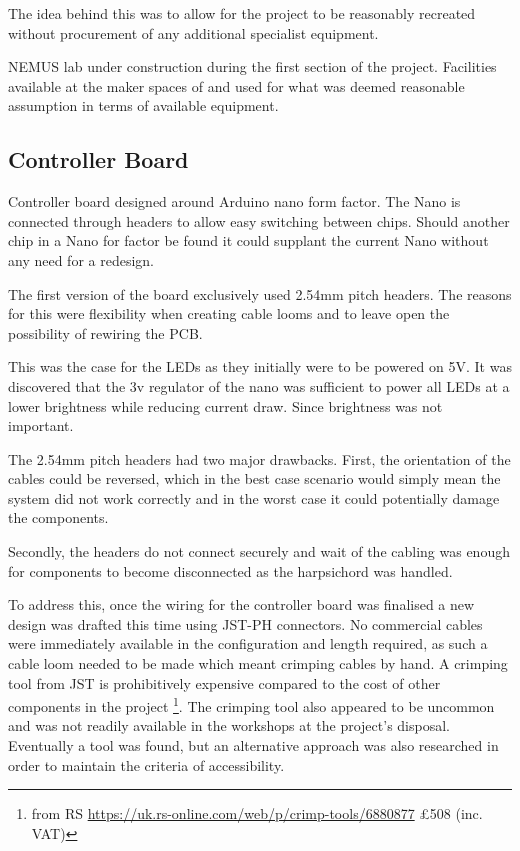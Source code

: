 The idea behind this was to allow for the project to be reasonably
recreated without procurement of any additional specialist equipment.

NEMUS lab under construction during the first section of the project.
Facilities available at the maker spaces of  and
 used for what was deemed reasonable assumption in
terms of available equipment.


\subsection{Controller Board}\label{controller-board}

Controller board designed around Arduino nano form factor. The Nano is
connected through headers to allow easy switching between chips. Should
another chip in a Nano for factor be found it could supplant the current
Nano without any need for a redesign.

The first version of the board exclusively used 2.54mm pitch headers.
The reasons for this were flexibility when creating cable looms and to
leave open the possibility of rewiring the PCB.

This was the case for the LEDs as they initially were to be powered on
5V. It was discovered that the 3v regulator of the nano was sufficient
to power all LEDs at a lower brightness while reducing current draw.
Since brightness was not important.

The 2.54mm pitch headers had two major drawbacks. First, the orientation
of the cables could be reversed, which in the best case scenario would
simply mean the system did not work correctly and in the worst case it
could potentially damage the components.

Secondly, the headers do not connect securely and wait of the cabling
was enough for components to become disconnected as the harpsichord was
handled.

To address this, once the wiring for the controller board was finalised
a new design was drafted this time using JST-PH connectors. No
commercial cables were immediately available in the configuration and
length required, as such a cable loom needed to be made which meant
crimping cables by hand. A crimping tool from JST is prohibitively
expensive compared to the cost of other components in the project
\footnote{from RS \url{https://uk.rs-online.com/web/p/crimp-tools/6880877}
£508 (inc. VAT)}. The crimping tool also appeared to be uncommon and was
not readily available in the workshops at the project's disposal.
Eventually a tool was found, but an alternative approach was also
researched in order to maintain the criteria of accessibility.

